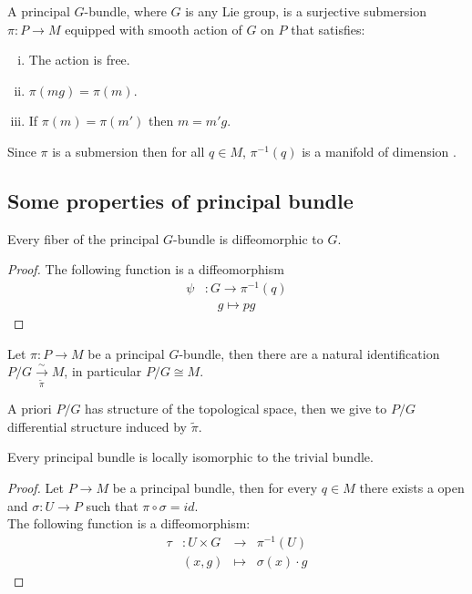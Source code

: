 A principal $G$-bundle, where $G$ is any Lie group, is a surjective submersion $\pi: P \to M$ equipped with smooth action of $G$ on $P$ that satisfies:
\begin{enumerate}[(i)]
	\item The action is free.
	\item $\pi(mg)=\pi(m)$.
	\item If $\pi(m)=\pi(m')$ then $m=m'g$.
\end{enumerate}
Since $\pi$ is a submersion then for all $q\in M$, $ \pi^{-1}(q)$ is a manifold of dimension .\\

\subsection{Some properties of principal bundle}
\begin{theorem}
	Every fiber of the principal $G$-bundle is diffeomorphic to $G$.
\end{theorem}
\begin{proof} The following function is a diffeomorphism
	\begin{align*}
	\psi &: G \longrightarrow \pi^{-1}(q) \\
	&\quad g \longmapsto pg
	\end{align*}
\end{proof}


		\begin{theorem}
	Let $\pi: P \to M $ be a principal  $G$-bundle, then there are a natural identification $P/G  \xrightarrow[\tilde{\pi}]{\sim} M$, in particular $P/G \cong M$.
\end{theorem}

A priori $P/G$ has structure of the topological space, then we give to $P/G$ differential structure induced by $\tilde{\pi}$.

\begin{theorem} Every principal bundle is locally isomorphic to the trivial bundle.
\end{theorem}
\begin{proof}
Let  $P \to M$ be a principal bundle, then for every $q \in M$ there exists a open  and  $\sigma: U \to P$ such that $\pi \circ \sigma=id$.\\
The following function is a diffeomorphism:
	$$\begin{array}{crcl}
\tau &: U \times G & \longrightarrow & \pi^{-1}(U) \\
& (x,g) & \mapsto & \sigma(x)\cdot g
\end{array}$$
\end{proof}

